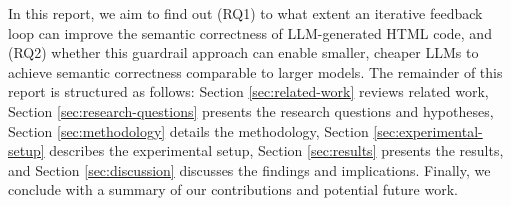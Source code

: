 

In this report, we aim to find out (RQ1) to what extent an iterative feedback loop can improve the semantic correctness of LLM-generated HTML code, and (RQ2) whether this guardrail approach can enable smaller, cheaper LLMs to achieve semantic correctness comparable to larger models. The remainder of this report is structured as follows: Section \ref{sec:related-work} reviews related work, Section \ref{sec:research-questions} presents the research questions and hypotheses, Section \ref{sec:methodology} details the methodology, Section \ref{sec:experimental-setup} describes the experimental setup, Section \ref{sec:results} presents the results, and Section \ref{sec:discussion} discusses the findings and implications. Finally, we conclude with a summary of our contributions and potential future work.